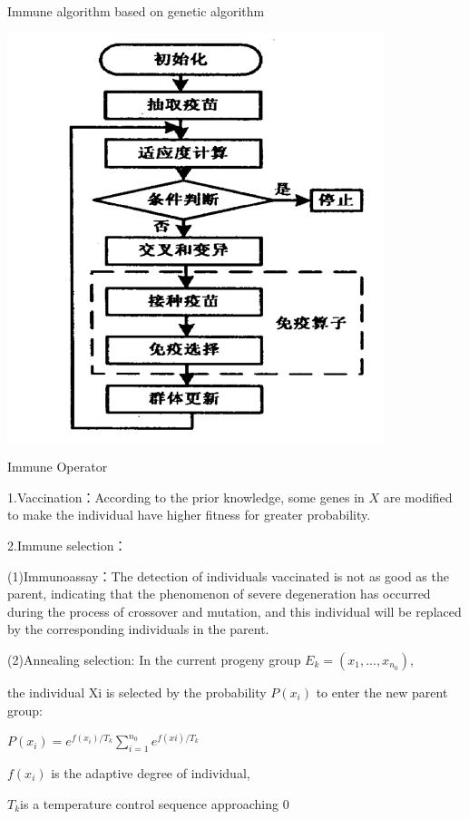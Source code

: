 \begin{frame}{Immune algorithm based on genetic algorithm}
 
  
  \par
  \centering
  \includegraphics[scale=0.6]{img/5.PNG}
  \par
  
\end{frame}

\begin{frame}{Immune Operator}
 
 \indent 
 1.Vaccination：According to the prior knowledge, some genes in $X$ are modified to make the individual have higher fitness for greater probability. 
 
 
2.Immune selection：
\par\setlength\parindent{6em}
(1)Immunoassay：The detection of individuals vaccinated is not as good as the parent, indicating that the phenomenon of severe degeneration has occurred during the process of crossover and mutation, and this individual will be replaced by the corresponding individuals in the parent.
\par\setlength\parindent{6em}
(2)Annealing selection:
In the current progeny group $E_k=(x_1,...,x_{n_0})$, 

the individual Xi is selected by the probability $P(x_i)$ to enter the new parent group:
\par\setlength\parindent{6em}
$P(x_i)=e^{f(x_i)/T_k}\sum_{i=1}^{n_0}e^{f(xi)/T_k}$
\par\setlength\parindent{6em}
$f(x_i)$ is the adaptive degree of individual,
\par\setlength\parindent{6em}
$T_k$is a temperature control sequence approaching 0
\end{frame}


